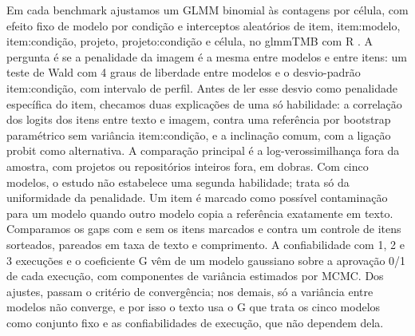 Em cada benchmark ajustamos um GLMM binomial às contagens por célula, com efeito fixo de modelo por condição e interceptos aleatórios de item, item:modelo, item:condição, projeto, projeto:condição e célula, no glmmTMB \citep{brooks2017glmmtmb} \glmmTmbVersion{} com R \rVersion. A pergunta é se a penalidade da imagem é a mesma entre modelos e entre itens: um teste de Wald com 4 graus de liberdade entre modelos e o desvio-padrão item:condição, com intervalo de perfil. Antes de ler esse desvio como penalidade específica do item, checamos duas explicações de uma só habilidade: a correlação dos logits dos itens entre texto e imagem, contra uma referência por bootstrap paramétrico sem variância item:condição, e a inclinação comum, com a ligação probit como alternativa. A comparação principal é a log-verossimilhança fora da amostra, com projetos ou repositórios inteiros fora, em \heldoutFoldsDev dobras. Com cinco modelos, o estudo não estabelece uma segunda habilidade; trata só da uniformidade da penalidade. Um item é marcado como possível contaminação para um modelo quando outro modelo copia a referência exatamente em texto. Comparamos os gaps com e sem os itens marcados e contra um controle de itens sorteados, pareados em taxa de texto e comprimento. A confiabilidade com 1, 2 e 3 execuções e o coeficiente G vêm de um modelo gaussiano sobre a aprovação 0/1 de cada execução, com componentes de variância estimados por MCMC. Dos \relFits ajustes, \relFitsPassed passam o critério de convergência; nos demais, só a variância entre modelos não converge, e por isso o texto usa o G que trata os cinco modelos como conjunto fixo e as confiabilidades de execução, que não dependem dela.

